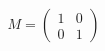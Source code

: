 \documentclass[preview]{standalone}
\begin{document}
\begin{align*}
M = \begin{pmatrix} 1 & 0 \\ 0 & 1 \end{pmatrix}
\end{align*}
\end{document}
